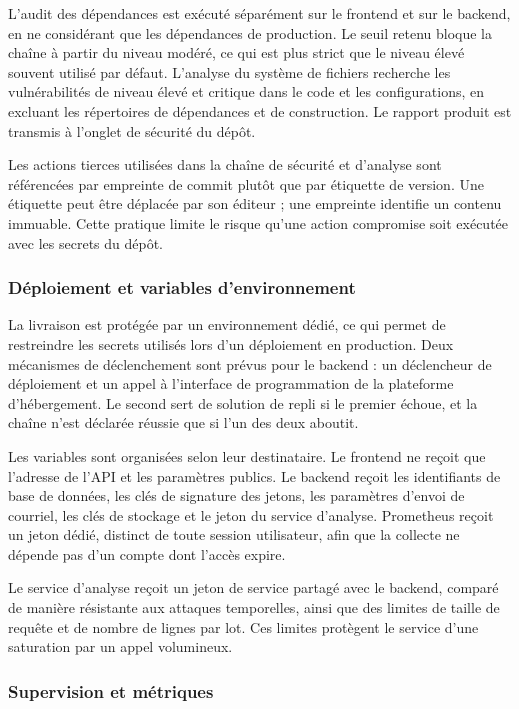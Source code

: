 L'audit des dépendances est exécuté séparément sur le frontend et sur le backend, en ne considérant que les dépendances de production. Le seuil retenu bloque la chaîne à partir du niveau modéré, ce qui est plus strict que le niveau élevé souvent utilisé par défaut. L'analyse du système de fichiers recherche les vulnérabilités de niveau élevé et critique dans le code et les configurations, en excluant les répertoires de dépendances et de construction. Le rapport produit est transmis à l'onglet de sécurité du dépôt.

Les actions tierces utilisées dans la chaîne de sécurité et d'analyse sont référencées par empreinte de commit plutôt que par étiquette de version. Une étiquette peut être déplacée par son éditeur ; une empreinte identifie un contenu immuable. Cette pratique limite le risque qu'une action compromise soit exécutée avec les secrets du dépôt.

\subsubsection{Déploiement et variables d'environnement}

La livraison est protégée par un environnement dédié, ce qui permet de restreindre les secrets utilisés lors d'un déploiement en production. Deux mécanismes de déclenchement sont prévus pour le backend : un déclencheur de déploiement et un appel à l'interface de programmation de la plateforme d'hébergement. Le second sert de solution de repli si le premier échoue, et la chaîne n'est déclarée réussie que si l'un des deux aboutit.

Les variables sont organisées selon leur destinataire. Le frontend ne reçoit que l'adresse de l'API et les paramètres publics. Le backend reçoit les identifiants de base de données, les clés de signature des jetons, les paramètres d'envoi de courriel, les clés de stockage et le jeton du service d'analyse. Prometheus reçoit un jeton dédié, distinct de toute session utilisateur, afin que la collecte ne dépende pas d'un compte dont l'accès expire.

Le service d'analyse reçoit un jeton de service partagé avec le backend, comparé de manière résistante aux attaques temporelles, ainsi que des limites de taille de requête et de nombre de lignes par lot. Ces limites protègent le service d'une saturation par un appel volumineux.

\subsubsection{Supervision et métriques}

